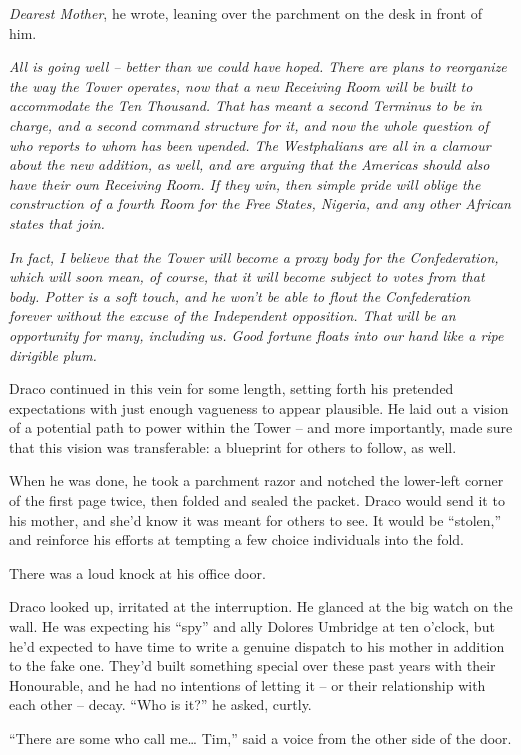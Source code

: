\emph{Dearest Mother}, he wrote, leaning over the parchment on the desk
in front of him.

\emph{All is going well -- better than we could have hoped. There are
plans to reorganize the way the Tower operates, now that a new Receiving
Room will be built to accommodate the Ten Thousand. That has meant a
second Terminus to be in charge, and a second command structure for it,
and now the whole question of who reports to whom has been upended. The
Westphalians are all in a clamour about the new addition, as well, and
are arguing that the Americas should also have their own Receiving Room.
If they win, then simple pride will oblige the construction of a fourth
Room for the Free States, Nigeria, and any other African states that
join.}

\emph{In fact, I believe that the Tower will become a proxy body for the
Confederation, which will soon mean, of course, that it will become
subject to votes from that body. Potter is a soft touch, and he won't be
able to flout the Confederation forever without the excuse of the
Independent opposition. That will be an opportunity for many, including
us. Good fortune floats into our hand like a ripe dirigible plum.}

Draco continued in this vein for some length, setting forth his
pretended expectations with just enough vagueness to appear plausible.
He laid out a vision of a potential path to power within the Tower --
and more importantly, made sure that this vision was transferable: a
blueprint for others to follow, as well.

When he was done, he took a parchment razor and notched the lower-left
corner of the first page twice, then folded and sealed the packet. Draco
would send it to his mother, and she'd know it was meant for others to
see. It would be ``stolen,'' and reinforce his efforts at tempting a few
choice individuals into the fold.

There was a loud knock at his office door.

Draco looked up, irritated at the interruption. He glanced at the big
watch on the wall. He was expecting his ``spy'' and ally Dolores
Umbridge at ten o'clock, but he'd expected to have time to write a
genuine dispatch to his mother in addition to the fake one. They'd built
something special over these past years with their Honourable, and he
had no intentions of letting it -- or their relationship with each other
-- decay. ``Who is it?'' he asked, curtly.

``There are some who call me\ldots{} Tim,'' said a voice from the other
side of the door.

